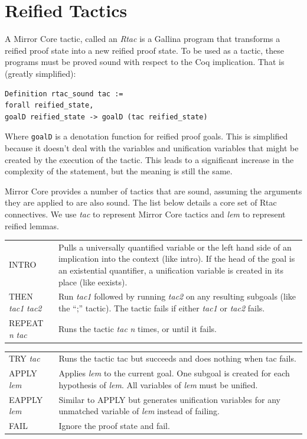 \documentclass{puthesis}
\begin{document}
\section{Reified Tactics}

A Mirror Core tactic, called an \emph{Rtac} is a Gallina program that transforms
a reified proof state into a new reified proof state. To be used as a
tactic, these programs must be proved sound with respect to the Coq
implication. That is (greatly simplified):

\begin{lstlisting}
Definition rtac_sound tac := 
forall reified_state,
goalD reified_state -> goalD (tac reified_state)
\end{lstlisting}

Where \lstinline|goalD| is a denotation function for reified proof
goals. This is simplified because it doesn't deal with the variables
and unification variables that might be created by the execution of
the tactic. This leads to a significant increase in the complexity of
the statement, but the meaning is still the same.

Mirror Core provides a number of tactics that are sound, assuming the
arguments they are applied to are also sound. 
The list below details a core set of Rtac connectives. We use 
{\it tac} to represent Mirror Core tactics and {\it lem} to represent reified lemmas.

\vspace{5mm}

\noindent \begin{tabular}{l@{\quad\quad}p{90mm}}
{\sf INTRO} & Pulls a universally quantified variable or the left hand
side of an
implication into the context (like {\sf intro}). If the head of the goal is an existential
quantifier, a unification variable is created in its place (like {\sf
  eexists}). \\
{\sf THEN} {\it tac1} {\it tac2} & Run {\it tac1} followed by running {\it
  tac2} on any resulting subgoals (like the ``{\sf ;}'' tactic). The tactic fails if either 
  {\it tac1} or {\it tac2} fails.\\
{\sf REPEAT} {\it n} {\it tac} & Runs the tactic {\it tac} {\it n}
times, or until it fails. \\
\end{tabular}

\noindent \begin{tabular}{l@{\quad\quad}p{90mm}}
{\sf TRY} {\it tac} & Runs the tactic {\sf tac} but succeeds and does
nothing when {\sf tac} fails.\\
{\sf APPLY} {\it lem} & Applies {\it lem} to the current goal. One
subgoal is created for each hypothesis of {\it lem}. All variables of
{\it lem} must be unified.\\
{\sf EAPPLY} {\it lem} & Similar to {\sf APPLY} but generates
unification variables for any unmatched variable of {\it lem} instead
of failing. \\
{\sf FAIL} & Ignore the proof state and fail. \\ 
\end{tabular}
\end{document}
